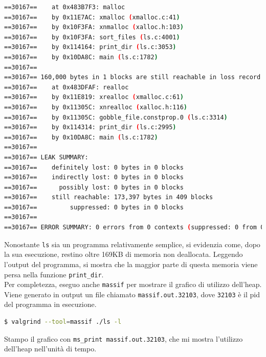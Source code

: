 \documentclass{article}
\begin{document}
\begin{lstlisting}[language=bash]
==30167==    at 0x483B7F3: malloc 
==30167==    by 0x11E7AC: xmalloc (xmalloc.c:41)
==30167==    by 0x10F3FA: xnmalloc (xalloc.h:103)
==30167==    by 0x10F3FA: sort_files (ls.c:4001)
==30167==    by 0x114164: print_dir (ls.c:3053)
==30167==    by 0x10DA8C: main (ls.c:1782)
==30167== 
==30167== 160,000 bytes in 1 blocks are still reachable in loss record 8 of 8
==30167==    at 0x483DFAF: realloc 
==30167==    by 0x11E819: xrealloc (xmalloc.c:61)
==30167==    by 0x11305C: xnrealloc (xalloc.h:116)
==30167==    by 0x11305C: gobble_file.constprop.0 (ls.c:3314)
==30167==    by 0x114314: print_dir (ls.c:2995)
==30167==    by 0x10DA8C: main (ls.c:1782)
==30167== 
==30167== LEAK SUMMARY:
==30167==    definitely lost: 0 bytes in 0 blocks
==30167==    indirectly lost: 0 bytes in 0 blocks
==30167==      possibly lost: 0 bytes in 0 blocks
==30167==    still reachable: 173,397 bytes in 409 blocks
==30167==         suppressed: 0 bytes in 0 blocks
==30167== 
==30167== ERROR SUMMARY: 0 errors from 0 contexts (suppressed: 0 from 0)
\end{lstlisting}

Nonostante \texttt{ls} sia un programma relativamente semplice, si evidenzia
come, dopo la sua esecuzione, restino oltre 169KB di memoria non deallocata.
Leggendo l'output del programma, si mostra che la maggior parte di questa
memoria viene persa nella funzione \texttt{print\_dir}. \\

Per completezza, eseguo anche \texttt{massif} per mostrare il grafico di
utilizzo dell'heap. Viene generato in output un file chiamato
\texttt{massif.out.32103}, dove \texttt{32103} è il pid del programma in
esecuzione.

\begin{lstlisting}[language=bash]
$ valgrind --tool=massif ./ls -l
\end{lstlisting}

Stampo il grafico con \texttt{ms\_print massif.out.32103}, che mi mostra
l'utilizzo dell'heap nell'unità di tempo.
\end{document}
